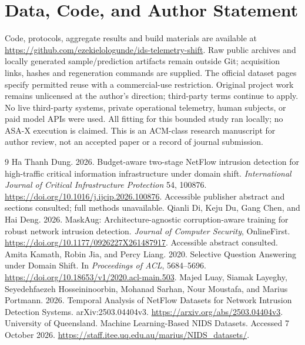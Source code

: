 \documentclass[manuscript,screen,nonacm]{acmart}
\begin{document}
\section*{Data, Code, and Author Statement}
Code, protocols, aggregate results and build materials are available at \url{https://github.com/ezekielologunde/ids-telemetry-shift}. Raw public archives and locally generated sample/prediction artifacts remain outside Git; acquisition links, hashes and regeneration commands are supplied. The official dataset pages specify permitted reuse with a commercial-use restriction. Original project work remains unlicensed at the author's direction; third-party terms continue to apply. No live third-party systems, private operational telemetry, human subjects, or paid model APIs were used. All fitting for this bounded study ran locally; no ASA-X execution is claimed. This is an ACM-class research manuscript for author review, not an accepted paper or a record of journal submission.

\begin{thebibliography}{9}
 Ha Thanh Dung. 2026. Budget-aware two-stage NetFlow intrusion detection for high-traffic critical information infrastructure under domain shift. \emph{International Journal of Critical Infrastructure Protection} 54, 100876. \url{https://doi.org/10.1016/j.ijcip.2026.100876}. Accessible publisher abstract and sections consulted; full methods unavailable.
 Qianli Di, Keju Du, Gang Chen, and Hai Deng. 2026. MaskAug: Architecture-agnostic corruption-aware training for robust network intrusion detection. \emph{Journal of Computer Security}, OnlineFirst. \url{https://doi.org/10.1177/0926227X261487917}. Accessible abstract consulted.
 Amita Kamath, Robin Jia, and Percy Liang. 2020. Selective Question Answering under Domain Shift. In \emph{Proceedings of ACL}, 5684--5696. \url{https://doi.org/10.18653/v1/2020.acl-main.503}.
 Majed Luay, Siamak Layeghy, Seyedehfaezeh Hosseininoorbin, Mohanad Sarhan, Nour Moustafa, and Marius Portmann. 2026. Temporal Analysis of NetFlow Datasets for Network Intrusion Detection Systems. arXiv:2503.04404v3. \url{https://arxiv.org/abs/2503.04404v3}.
 University of Queensland. Machine Learning-Based NIDS Datasets. Accessed 7 October 2026. \url{https://staff.itee.uq.edu.au/marius/NIDS_datasets/}.
\end{thebibliography}
\end{document}
